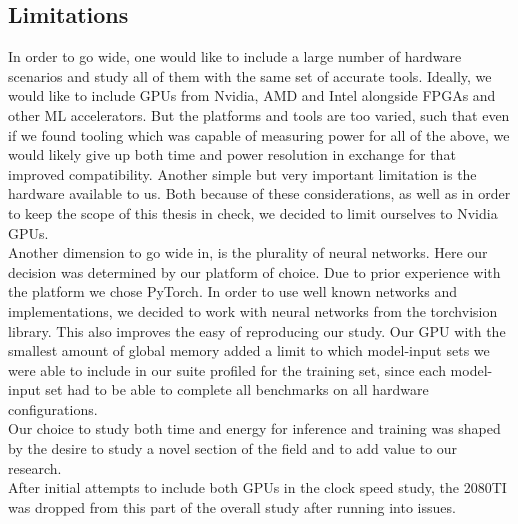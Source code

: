 \subsection{Limitations}
In order to go wide, one would like to include a large number of hardware scenarios and study all of them with the same set of accurate tools. Ideally, we would like to include GPUs from Nvidia, AMD and Intel alongside FPGAs and other ML accelerators. But the platforms and tools are too varied, such that even if we found tooling which was capable of measuring power for all of the above, we would likely give up both time and power resolution in exchange for that improved compatibility. Another simple but very important limitation is the hardware available to us. Both because of these considerations, as well as in order to keep the scope of this thesis in check, we decided to limit ourselves to Nvidia GPUs. \\
Another dimension to go wide in, is the plurality of neural networks. Here our decision was determined by our platform of choice. Due to prior experience with the platform we chose PyTorch. In order to use well known networks and implementations, we decided to work with neural networks from the torchvision library. This also improves the easy of reproducing our study. Our GPU with the smallest amount of global memory added a limit to which model-input sets we were able to include in our suite profiled for the training set, since each model-input set had to be able to complete all benchmarks on all hardware configurations. \\
Our choice to study both time and energy for inference and training was shaped by the desire to study a novel section of the field and to add value to our research.  \\
After initial attempts to include both GPUs in the clock speed study, the 2080TI was dropped from this part of the overall study after running into issues.

